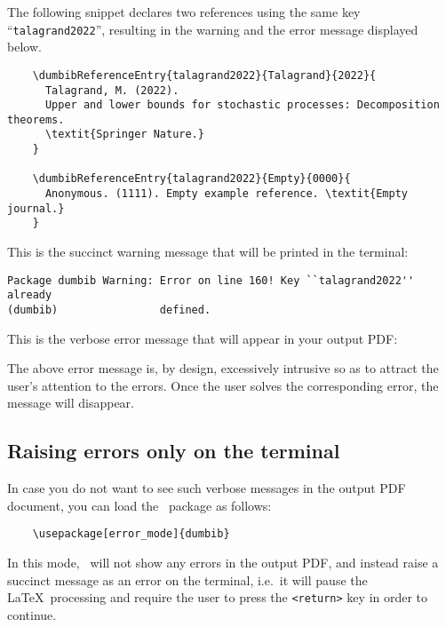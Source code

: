 \documentclass[letter, 11pt]{article}
\begin{document}
  The following snippet declares two references using the same key ``\texttt{talagrand2022}'', resulting in the warning and the error message displayed below.
  \begin{verbatim}
    \dumbibReferenceEntry{talagrand2022}{Talagrand}{2022}{
      Talagrand, M. (2022).
      Upper and lower bounds for stochastic processes: Decomposition theorems.
      \textit{Springer Nature.}
    }
    
    \dumbibReferenceEntry{talagrand2022}{Empty}{0000}{
      Anonymous. (1111). Empty example reference. \textit{Empty journal.}
    }
  \end{verbatim}
  This is the succinct warning message that will be printed in the terminal:
\begin{verbatim}
Package dumbib Warning: Error on line 160! Key ``talagrand2022'' already
(dumbib)                defined.
\end{verbatim}
  This is the verbose error message that will appear in your output PDF:
  
  
  The above error message is, by design, excessively intrusive so as to attract the user's attention to the errors. Once the user solves the corresponding error, the message will disappear.

  \subsection*{Raising errors only on the terminal}
  In case you do not want to see such verbose messages in the output PDF document, you can load the \dumbib\ package as follows:
  \begin{verbatim}
    \usepackage[error_mode]{dumbib}
  \end{verbatim}
  In this mode, \dumbib\ will not show any errors in the output PDF, and instead raise a succinct message as an error on the terminal, i.e.\ it will pause the \LaTeX\ processing and require the user to press the \texttt{<return>} key in order to continue.
\end{document}
